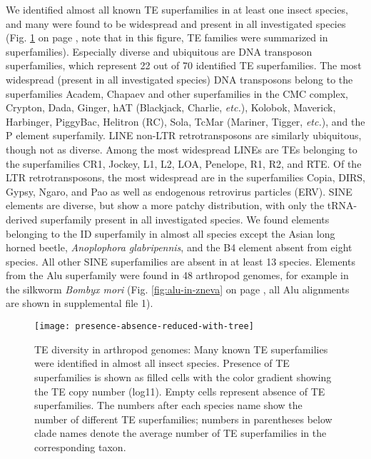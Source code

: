 We identified almost all known TE superfamilies in at least one insect
species, and many were found to be widespread and present in all
investigated species (Fig. \ref{fig:presence-absence} on page
\pageref{fig:presence-absence}, note that in this figure, TE families
were summarized in superfamilies). Especially diverse and ubiquitous are
DNA transposon superfamilies, which represent 22 out of 70 identified TE
superfamilies. The most widespread (present in all investigated species)
DNA transposons belong to the superfamilies Academ, Chapaev and other
superfamilies in the CMC complex, Crypton, Dada, Ginger, hAT (Blackjack,
Charlie, \emph{etc.}), Kolobok, Maverick, Harbinger, PiggyBac, Helitron
(RC), Sola, TcMar (Mariner, Tigger, \emph{etc.}), and the P element
superfamily. LINE non-LTR retrotransposons are similarly ubiquitous,
though not as diverse. Among the most widespread LINEs are TEs belonging
to the superfamilies CR1, Jockey, L1, L2, LOA, Penelope, R1, R2, and
RTE. Of the LTR retrotransposons, the most widespread are in the
superfamilies Copia, DIRS, Gypsy, Ngaro, and Pao as well as endogenous
retrovirus particles (ERV). SINE elements are diverse, but show a more
patchy distribution, with only the tRNA-derived superfamily present in
all investigated species. We found elements belonging to the ID
superfamily in almost all species except the Asian long horned beetle,
\emph{Anoplophora glabripennis}, and the B4 element absent from eight
species. All other SINE superfamilies are absent in at least 13 species.
Elements from the Alu superfamily were found in 48 arthropod genomes,
for example in the silkworm \emph{Bombyx mori} (Fig.
\ref{fig:alu-in-zneva} on page \pageref{fig:alu-in-zneva}, all Alu
alignments are shown in supplemental file 1).

\begin{figure}[h!]
\begin{center}
\texttt{[image: presence-absence-reduced-with-tree]}
\caption{{TE diversity in arthropod genomes: Many known TE superfamilies were
identified in almost all insect species. Presence of TE superfamilies is
shown as filled cells with the color gradient showing the TE copy number
(log11). Empty cells represent absence of TE superfamilies. The numbers
after each species name show the number of different TE superfamilies;
numbers in parentheses below clade names denote the average number of TE
superfamilies in the corresponding taxon.%
}}%
\label{fig:presence-absence}%
\end{center}
\end{figure}

